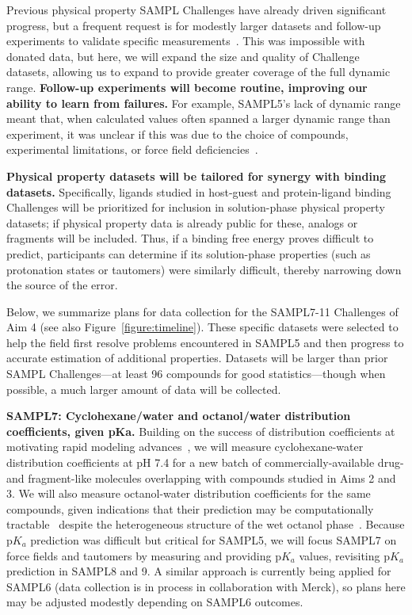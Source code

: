\documentclass[11pt]{article}
\begin{document}
Previous physical property SAMPL Challenges have already driven significant progress, but a frequent request is for modestly larger datasets and follow-up experiments to validate specific measurements~\cite{Mobley:2017:eScholarship}. 
This was impossible with donated data, but here, we will expand the size and quality of Challenge datasets, allowing us to expand to provide greater coverage of the full dynamic range. 
\textbf{Follow-up experiments will become routine, improving our ability to learn from failures.}
For example, SAMPL5's lack of dynamic range meant that, when calculated values often spanned a larger dynamic range than experiment, it was unclear if this was due to the choice of compounds, experimental limitations, or force field deficiencies~\cite{rustenburg_measuring_2016, Bannan:2016:JComputAidedMolDes, paranahewage_predicting_2016, klamt_prediction_2016}.  

{\bf Physical property datasets will be tailored for synergy with binding datasets.}
Specifically, ligands studied in host-guest and protein-ligand binding Challenges will be prioritized for inclusion in solution-phase physical property datasets; if physical property data is already public for these, analogs or fragments will be included. 
Thus, if a binding free energy proves difficult to predict, participants can determine if its solution-phase properties (such as protonation states or tautomers) were similarly difficult, thereby narrowing down the source of the error.

Below, we summarize plans for data collection for the SAMPL7-11 Challenges of Aim 4 (see also Figure~\ref{figure:timeline}).
These specific datasets were selected to help the field first resolve problems encountered in SAMPL5 and then progress to accurate estimation of additional properties.
Datasets will be larger than prior SAMPL Challenges---at least 96 compounds for good statistics---though when possible, a much larger amount of data will be collected.

\textbf{SAMPL7: Cyclohexane/water and octanol/water distribution coefficients, given pKa.}
Building on the success of distribution coefficients at motivating rapid modeling advances~\cite{Bannan:2016:JComputAidedMolDes}, we will measure cyclohexane-water distribution coefficients at pH 7.4 for a new batch of commercially-available drug- and fragment-like molecules overlapping with compounds studied in Aims 2 and 3.
We will also measure octanol-water distribution coefficients for the same compounds, given indications that their prediction may be computationally tractable~\cite{Bhatnagar:2013:PhysicalChemistryChemicalPhysics, bannan_calculating_2016} despite the heterogeneous structure of the wet octanol phase~\cite{Kollman:1996:AccountsofChemicalResearch}.
Because p$K_a$ prediction was difficult but critical for SAMPL5, we will focus SAMPL7 on force fields and tautomers by measuring and providing p$K_a$ values, revisiting p$K_a$ prediction in SAMPL8 and 9.
A similar approach is currently being applied for SAMPL6 (data collection is in process in collaboration with Merck), so plans here may be adjusted modestly depending on SAMPL6 outcomes.
\end{document}
